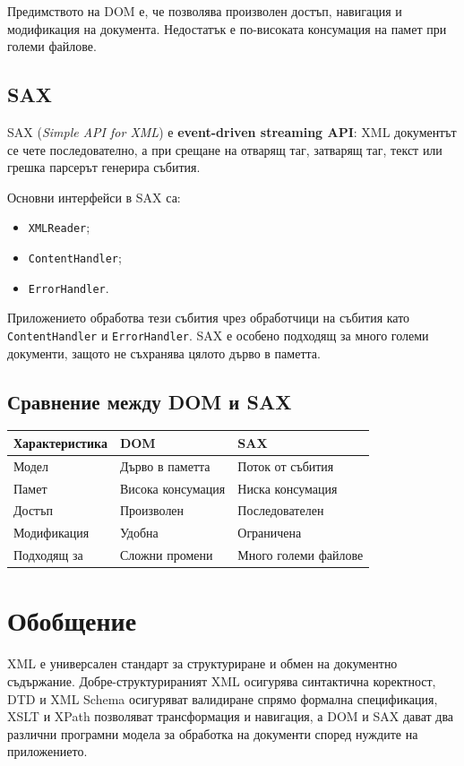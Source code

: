 \documentclass{scrartcl}
\begin{document}
\begin{FlushLeft}
Предимството на DOM е, че позволява произволен достъп, навигация и модификация на документа. Недостатък е по-високата консумация на памет при големи файлове.

\subsection{SAX}

SAX (\textit{Simple API for XML}) е \textbf{event-driven streaming API}: XML документът се чете последователно, а при срещане на отварящ таг, затварящ таг, текст или грешка парсерът генерира събития.

Основни интерфейси в SAX са:

\begin{itemize}
    \item \texttt{XMLReader};
    \item \texttt{ContentHandler};
    \item \texttt{ErrorHandler}.
\end{itemize}

Приложението обработва тези събития чрез обработчици на събития като \texttt{ContentHandler} и \texttt{ErrorHandler}. SAX е особено подходящ за много големи документи, защото не съхранява цялото дърво в паметта.

\subsection{Сравнение между DOM и SAX}

\begin{center}
\begin{tabular}{|l|l|l|}
\hline
\textbf{Характеристика} & \textbf{DOM} & \textbf{SAX} \\
\hline
Модел & Дърво в паметта & Поток от събития \\
\hline
Памет & Висока консумация & Ниска консумация \\
\hline
Достъп & Произволен & Последователен \\
\hline
Модификация & Удобна & Ограничена \\
\hline
Подходящ за & Сложни промени & Много големи файлове \\
\hline
\end{tabular}
\end{center}

\section{Обобщение}

XML е универсален стандарт за структуриране и обмен на документно съдържание. Добре-структурираният XML осигурява синтактична коректност, DTD и XML Schema осигуряват валидиране спрямо формална спецификация, XSLT и XPath позволяват трансформация и навигация, а DOM и SAX дават два различни програмни модела за обработка на документи според нуждите на приложението.

\end{FlushLeft}
\end{document}
